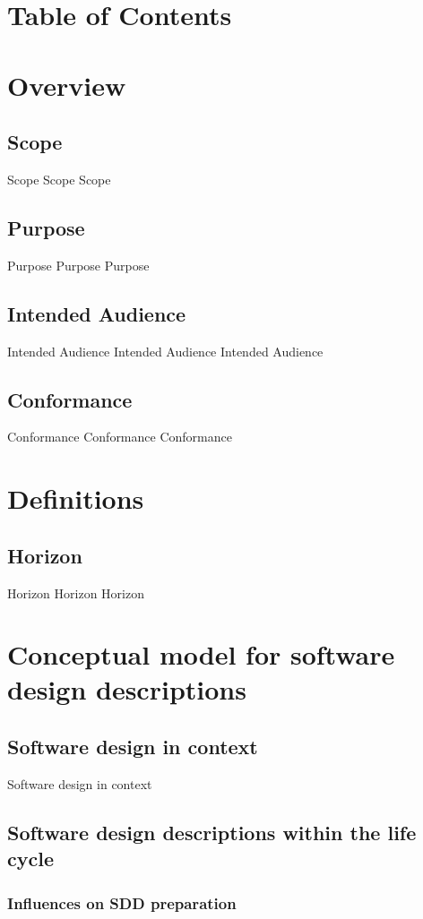 \documentclass[onecolumn, draftclsnofoot,10pt, compsoc]{IEEEtran}
\begin{document}
\section{Table of Contents}
\tableofcontents
\clearpage

\begin{singlespace}
\section{Overview}
	\subsection{Scope}
		Scope Scope Scope
	\subsection{Purpose}
		Purpose Purpose Purpose
	\subsection{Intended Audience}
		Intended Audience Intended Audience Intended Audience
	\subsection{Conformance}
		Conformance Conformance Conformance
\section{Definitions}
	\subsection{Horizon}
		Horizon Horizon Horizon
\section{Conceptual model for software design descriptions}
	\subsection{Software design in context}
		Software design in context
	\subsection{Software design descriptions within the life cycle}
		\subsubsection{Influences on SDD preparation}

\end{singlespace}
\end{document}
